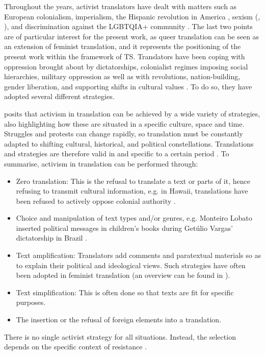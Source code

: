 Throughout the years, activist translators have dealt with matters such as European colonialism, imperialism, the Hispanic revolution in America \citep[227]{tymoczko2010space}, sexism (\cite{von1991feminist}, \cite*{von2016translation}), and discrimination against the LGBTQIA+ community \citep{burton2010inverting}. The last two points are of particular interest for the present work, as queer translation \citep{spurlin2014queering,baer2017introduction} can be seen as an extension of feminist translation, and it represents the positioning of the present work within the framework of TS. Translators have been coping with oppression brought about by dictatorships, colonialist regimes imposing social hierarchies, military oppression as well as with revolutions, nation-building, gender liberation, and supporting shifts in cultural values \citep[229]{tymoczko2010space}. To do so, they have adopted several different strategies. 

\textcite[229--235]{tymoczko2010space} posits that activism in translation can be achieved by a wide variety of strategies, also highlighting how these are situated in a specific culture, space and time. Struggles and protests can change rapidly, so translation must be constantly adapted to shifting cultural, historical, and political constellations. Translations and strategies are therefore valid in and specific to a certain period \citep[234--235]{tymoczko2010space}. To summarise, activism in translation can be performed through:
\begin{itemize}
\setlength\itemsep{-0.5em}
    \item Zero translation: This is the refusal to translate a text or parts of it, hence refusing to transmit cultural information, e.g. in Hawaii, translations have been refused to actively oppose colonial authority \citep{aiu2010ne}.
    \item Choice and manipulation of text types and/or genres, e.g. Monteiro Lobato inserted political messages in children's books during Getúlio Vargas' dictatorship in Brazil \citep{milton2006resistant}.
    \item Text amplification: Translators add comments and paratextual materials so as to explain their political and ideological views. Such strategies have often been adopted in feminist translation (an overview can be found in \cite{von1991feminist}).
    \item Text simplification: This is often done so that texts are fit for specific purposes.
    \item The insertion or the refusal of foreign elements into a translation.
\end{itemize}
There is no single activist strategy for all situations. Instead, the selection depends on the specific context of resistance \citep[230]{tymoczko2010space}.

